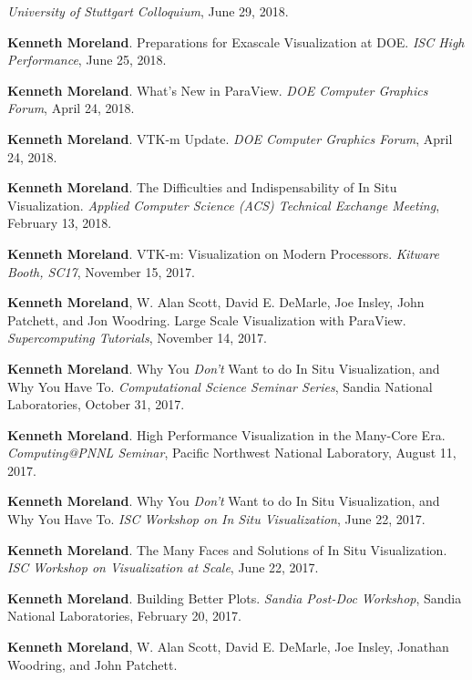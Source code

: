 \begin{enumerate}[label={[\arabic*]}, left=0pt]
  \emph{University of Stuttgart Colloquium}, June 29, 2018.
\item  %
  \textbf{Kenneth Moreland}.
  Preparations for Exascale Visualization at DOE.
  \emph{ISC High Performance}, June 25, 2018.
\item  %
  \textbf{Kenneth Moreland}.
  What's New in ParaView.
  \emph{DOE Computer Graphics Forum}, April 24, 2018.
\item  %
  \textbf{Kenneth Moreland}.
  VTK-m Update.
  \emph{DOE Computer Graphics Forum}, April 24, 2018.
\item  %
  \textbf{Kenneth Moreland}.
  The Difficulties and Indispensability of In Situ Visualization.
  \emph{Applied Computer Science (ACS) Technical Exchange Meeting}, February 13, 2018.
\item  %
  \textbf{Kenneth Moreland}.
  VTK-m: Visualization on Modern Processors.
  \emph{Kitware Booth, SC17}, November 15, 2017.
\item  %
  \textbf{Kenneth Moreland}, W. Alan Scott, David E. DeMarle, Joe Insley, John Patchett, and Jon Woodring.
  Large Scale Visualization with ParaView.
  \emph{Supercomputing Tutorials}, November 14, 2017.
\item  %
  \textbf{Kenneth Moreland}.
  Why You \emph{Don't} Want to do In Situ Visualization, and Why You Have To.
  \emph{Computational Science Seminar Series}, Sandia National Laboratories, October 31, 2017.
\item  %
  \textbf{Kenneth Moreland}.
  High Performance Visualization in the Many-Core Era.
  \emph{Computing@PNNL Seminar}, Pacific Northwest National Laboratory, August 11, 2017.
\item  %
  \textbf{Kenneth Moreland}.
  Why You \emph{Don't} Want to do In Situ Visualization, and Why You Have To.
  \emph{ISC Workshop on In Situ Visualization}, June 22, 2017.
\item  %
  \textbf{Kenneth Moreland}.
  The Many Faces and Solutions of In Situ Visualization.
  \emph{ISC Workshop on Visualization at Scale}, June 22, 2017.
\item  %
  \textbf{Kenneth Moreland}.
  Building Better Plots.
  \emph{Sandia Post-Doc Workshop}, Sandia National Laboratories, February 20, 2017.
\item  %
  \textbf{Kenneth Moreland}, W. Alan Scott, David E. DeMarle, Joe Insley, Jonathan Woodring, and John Patchett.

\end{enumerate}
